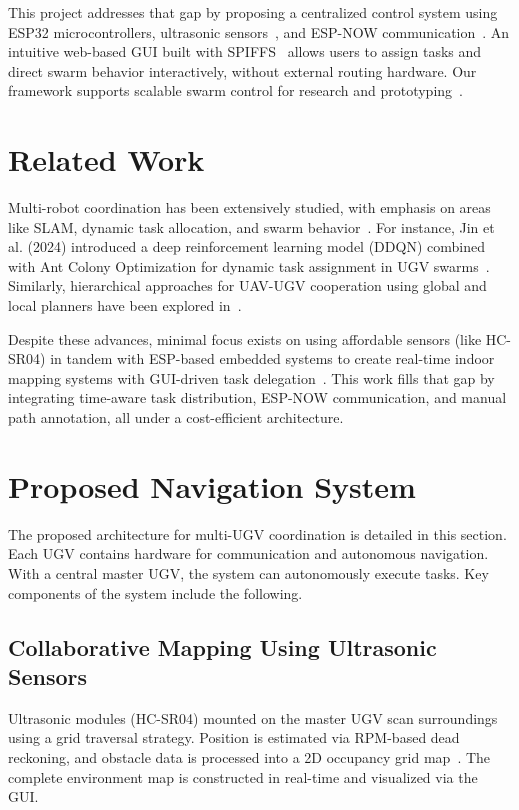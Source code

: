\documentclass[conference]{IEEEtran}
\begin{document}
\noindent This project addresses that gap by proposing a centralized control system using ESP32 microcontrollers, ultrasonic sensors~\cite{arduino_hcsr04}, and ESP-NOW communication~\cite{espnowguide}. An intuitive web-based GUI built with SPIFFS~\cite{randomnerd2024esp32} allows users to assign tasks and direct swarm behavior interactively, without external routing hardware. Our framework supports scalable swarm control for research and prototyping~\cite{jin2024multi, mdpi2022hierarchical, gadepalli2023future}.
\section{Related Work}
\label{sec:related-work}

Multi-robot coordination has been extensively studied, with emphasis on areas like SLAM, dynamic task allocation, and swarm behavior~\cite{brambilla2013swarm, kalra2005hoplite}. For instance, Jin et al. (2024) introduced a deep reinforcement learning model (DDQN) combined with Ant Colony Optimization for dynamic task assignment in UGV swarms~\cite{jin2024multi}. Similarly, hierarchical approaches for UAV-UGV cooperation using global and local planners have been explored in~\cite{mdpi2022hierarchical}.

Despite these advances, minimal focus exists on using affordable sensors (like HC-SR04) in tandem with ESP-based embedded systems to create real-time indoor mapping systems with GUI-driven task delegation~\cite{arduino_hcsr04, espnowguide, randomnerd2024esp32, gadepalli2023future}. This work fills that gap by integrating time-aware task distribution, ESP-NOW communication, and manual path annotation, all under a cost-efficient architecture.
\section{Proposed Navigation System}
\label{sec:proposed-system}

The proposed architecture for multi-UGV coordination is detailed in this section. Each UGV contains hardware for communication and autonomous navigation. With a central master UGV, the system can autonomously execute tasks. Key components of the system include the following.

\subsection{Collaborative Mapping Using Ultrasonic Sensors}
Ultrasonic modules (HC-SR04) mounted on the master UGV scan surroundings using a grid traversal strategy. Position is estimated via RPM-based dead reckoning, and obstacle data is processed into a 2D occupancy grid map~\cite{arduino_hcsr04, gadepalli2023future}. The complete environment map is constructed in real-time and visualized via the GUI.
\end{document}
